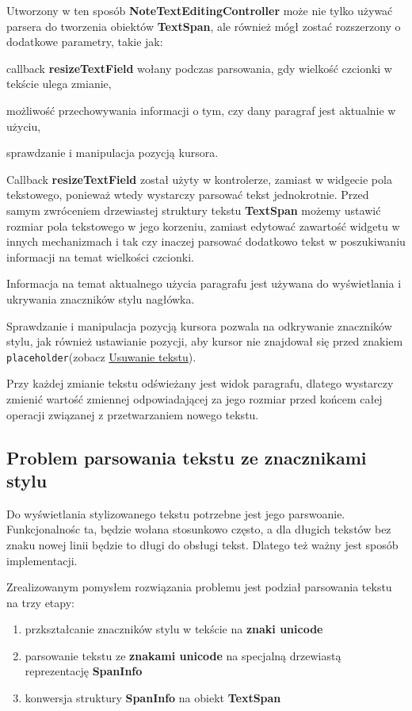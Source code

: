 Utworzony w ten sposób \textbf{NoteTextEditingController} może nie tylko używać parsera do tworzenia obiektów \textbf{TextSpan}, ale również mógł zostać rozszerzony o dodatkowe parametry, takie jak:

\begin{compactitem}
    \item callback \textbf{resizeTextField} wołany podczas parsowania, gdy wielkość czcionki w tekście ulega zmianie, 
    \item możliwość przechowywania informacji o tym, czy dany paragraf jest aktualnie w użyciu,
    \item sprawdzanie i manipulacja pozycją kursora.
\end{compactitem}

Callback \textbf{resizeTextField} został użyty w kontrolerze, zamiast w widgecie pola tekstowego, ponieważ wtedy wystarczy parsować tekst jednokrotnie. Przed samym zwróceniem drzewiastej struktury tekstu \textbf{TextSpan} możemy ustawić rozmiar pola tekstowego w jego korzeniu, zamiast edytować zawartość widgetu w innych mechanizmach i tak czy inaczej parsować dodatkowo tekst w poszukiwaniu informacji na temat wielkości czcionki.

Informacja na temat aktualnego użycia paragrafu jest używana do wyświetlania i ukrywania znaczników stylu nagłówka.

Sprawdzanie i manipulacja pozycją kursora pozwala na odkrywanie znaczników stylu, jak również ustawianie pozycji, aby kursor nie znajdował się przed znakiem \verb|placeholder|(zobacz \hyperref[eq:usuwanieTekstu]{Usuwanie tekstu}).

Przy każdej zmianie tekstu odświeżany jest widok paragrafu, dlatego wystarczy zmienić wartość zmiennej odpowiadającej za jego rozmiar przed końcem całej operacji związanej z przetwarzaniem nowego tekstu.

\subsection{Problem parsowania tekstu ze znacznikami stylu}

Do wyświetlania stylizowanego tekstu potrzebne jest jego parswoanie. Funkcjonalnośc ta, będzie wołana stosunkowo często, a dla długich tekstów bez znaku nowej linii będzie to długi do obsługi tekst. Dlatego też ważny jest sposób implementacji.

Zrealizowanym pomysłem rozwiązania problemu jest podział parsowania tekstu na trzy etapy:
\begin{enumerate}
    \setlength\itemsep{0mm}
    \item przkształcanie znaczników stylu w tekście na \textbf{znaki unicode}
    \item parsowanie tekstu ze \textbf{znakami unicode} na specjalną drzewiastą reprezentację \textbf{SpanInfo}
    \item konwersja struktury \textbf{SpanInfo} na obiekt \textbf{TextSpan}
\end{enumerate}

